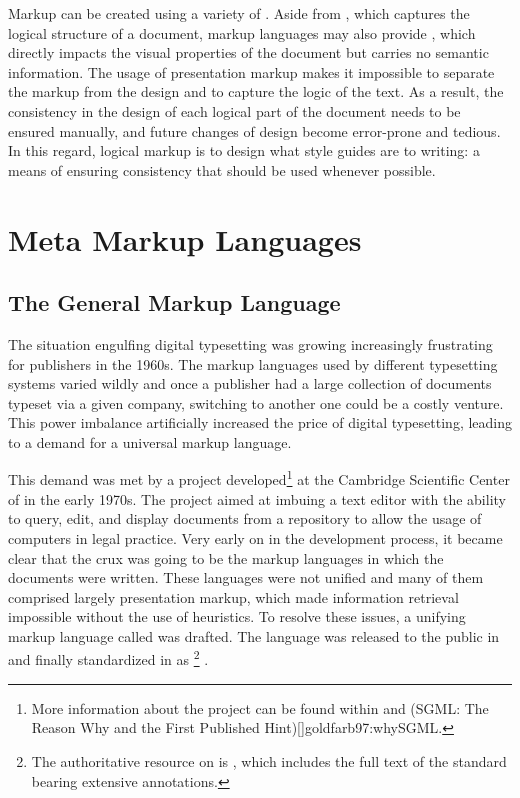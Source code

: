 \documentclass[
  a5paper,10pt,           %
  dvipsnames              %
]{book}
\begin{document}
Markup can be created using a variety of . Aside from
, which captures the logical structure of a document,
markup languages may also provide , which directly
impacts the visual properties of the document but carries no semantic
information. The usage of presentation markup makes it impossible to separate
the markup from the design and to capture the logic of the text. As a result,
the consistency in the design of each logical part of the document needs to be
ensured manually, and future changes of design become error-prone and tedious.
In this regard, logical markup is to design what style guides are to writing: a
means of ensuring consistency that should be used whenever possible.

\section{Meta Markup Languages}
\subsection{The General Markup Language}
The situation engulfing digital typesetting was growing increasingly frustrating
for publishers in the 1960s. The markup languages used by different typesetting
systems varied wildly and once a publisher had a large collection of documents
typeset via a given company, switching to another one could be a costly
venture. This power imbalance artificially increased the price of digital
typesetting, leading to a demand for a universal markup language.

This demand was met by a project developed\footnote{
  More information about the project can be found within
   and \citework*(SGML: The Reason Why and the First
  Published Hint)[]{goldfarb97:whySGML}.
} at the Cambridge Scientific Center of  in the early 1970s. The
project aimed at imbuing a text editor with the ability to query, edit, and
display documents from a repository to allow the usage of computers in legal
practice. Very early on in the development process, it became clear that the
crux was going to be the markup languages in which the documents were written.
These languages were not unified and many of them comprised largely presentation
markup, which made information retrieval impossible without the use of
heuristics. To resolve these issues, a unifying markup language called
 was drafted. The language was released \cite{goldfarb81}
to the public in \citeyear{goldfarb81} and finally standardized in
\citeyear{iso86} as \footnote{
  The authoritative resource on  is , which
  includes the full text of the standard bearing extensive annotations.
} \cite{iso86}.
\end{document}
